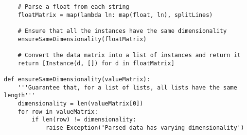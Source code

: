 \documentclass{article}
\begin{document}
\begin{verbatim}
    # Parse a float from each string
    floatMatrix = map(lambda ln: map(float, ln), splitLines)

    # Ensure that all the instances have the same dimensionality
    ensureSameDimensionality(floatMatrix)

    # Convert the data matrix into a list of instances and return it
    return [Instance(d, []) for d in floatMatrix]

def ensureSameDimensionality(valueMatrix):
    '''Guarantee that, for a list of lists, all lists have the same length'''
    dimensionality = len(valueMatrix[0])
    for row in valueMatrix:
        if len(row) != dimensionality:
            raise Exception('Parsed data has varying dimensionality')

\end{verbatim}
\end{document}
